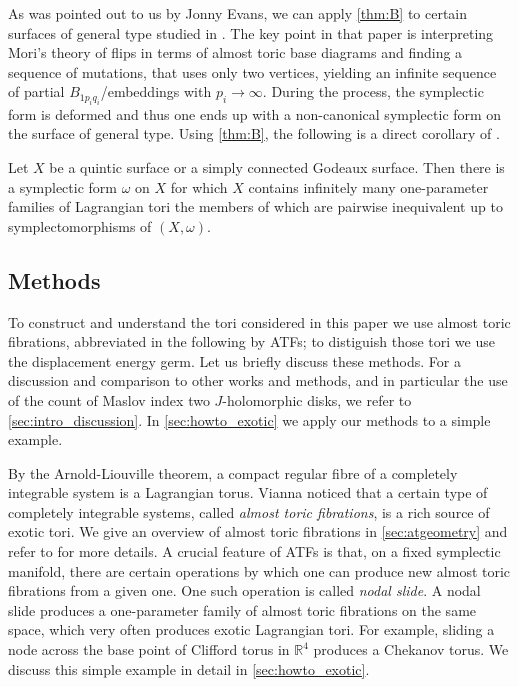 \documentclass[12pt,a4paper,abstract=true,final]{scrartcl}
\begin{document}
As was pointed out to us by Jonny Evans, we can apply \cref{thm:B} to certain surfaces of general type studied in \cite{EvaUrz21}.
The key point in that paper is interpreting Mori's theory of flips in terms of almost toric base diagrams and finding a sequence of mutations, that uses only two vertices,  yielding an infinite sequence of partial $B_{1p_iq_i}$\-/embeddings with $p_i \rightarrow \infty$.
During the process, the symplectic form is deformed and thus one ends up with a non-canonical symplectic form on the surface of general type.
Using \cref{thm:B}, the following is a direct corollary of \cite[Theorem 1.1]{EvaUrz21}.

\begin{corollary}
    \label{thm:quinticgodeaux}
    Let $X$ be a quintic surface or a simply connected Godeaux surface.
Then there is a symplectic form $\omega$ on $X$ for which $X$ contains infinitely many one-parameter families of Lagrangian tori the members of which are pairwise inequivalent up to symplectomorphisms of $(X,\omega)$.
\end{corollary}

\subsection{Methods}
\label{sec:intro_methods}

To construct and understand the tori considered in this paper we use almost toric fibrations, abbreviated in the following by ATFs; to distiguish those tori we use the displacement energy germ.
Let us briefly discuss these methods.
For a discussion and comparison to other works and methods, and in particular the use of the count of Maslov index two $J$-holomorphic disks, we refer to \cref{sec:intro_discussion}.
In \cref{sec:howto_exotic} we apply our methods to a simple example.

By the Arnold-Liouville theorem, a compact regular fibre of a completely integrable system is a Lagrangian torus. Vianna \cite{Via16,Via17} noticed that a certain type of completely integrable systems, called \emph{almost toric fibrations}, is a rich source of exotic tori. We give an overview of almost toric fibrations in \cref{sec:atgeometry} and refer to \cite{evans2021atfs} for more details. A crucial feature of ATFs is that, on a fixed symplectic manifold, there are certain operations by which one can produce new almost toric fibrations from a given one. One such operation is called \emph{nodal slide}. A nodal slide produces a one-parameter family of almost toric fibrations on the same space, which very often produces exotic Lagrangian tori. For example, sliding a node across the base point of Clifford torus in $\mathbb{R}^4$ produces a Chekanov torus. We discuss this simple example in detail in \cref{sec:howto_exotic}.
\end{document}
